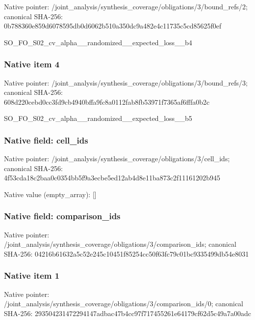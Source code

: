 \documentclass[10pt,a4paper]{article}
\begin{document}
Native pointer: /joint\_analysis/synthesi\allowbreak{}s\_coverage/obligations/3\allowbreak{}/bound\_refs/2; canonical SHA-256: 0b788360e859d6078595db0d\allowbreak{}6062b510a350dc9a482e4c11\allowbreak{}735c5cd85625f0ef


SO\_FO\_S02\_cv\_alpha\_\_rand\allowbreak{}omized\_\_expected\_loss\_\_b\allowbreak{}4


\subsubsection{Native item 4}


Native pointer: /joint\_analysis/synthesi\allowbreak{}s\_coverage/obligations/3\allowbreak{}/bound\_refs/3; canonical SHA-256: 608d220cebd0cc3fd9cb4940\allowbreak{}bffa9fc8a0112fab8fb53971\allowbreak{}f7365af6fffa0b2c


SO\_FO\_S02\_cv\_alpha\_\_rand\allowbreak{}omized\_\_expected\_loss\_\_b\allowbreak{}5


\subsubsection{Native field: cell\_ids}


Native pointer: /joint\_analysis/synthesi\allowbreak{}s\_coverage/obligations/3\allowbreak{}/cell\_ids; canonical SHA-256: 4f53cda18c2baa0c0354bb5f\allowbreak{}9a3ecbe5ed12ab4d8e11ba87\allowbreak{}3c2f11161202b945



Native value (empty\_array): []



\subsubsection{Native field: comparison\_ids}


Native pointer: /joint\_analysis/synthesi\allowbreak{}s\_coverage/obligations/3\allowbreak{}/comparison\_ids; canonical SHA-256: 04216b61632a5c52e245c104\allowbreak{}51f85254cc50f63fc79c01bc\allowbreak{}9335499db54e8031



\subsubsection{Native item 1}


Native pointer: /joint\_analysis/synthesi\allowbreak{}s\_coverage/obligations/3\allowbreak{}/comparison\_ids/0; canonical SHA-256: 293504231472294147adbac4\allowbreak{}7b4cc97f717455261e64179c\allowbreak{}f62d5c49a7a00adc
\end{document}
